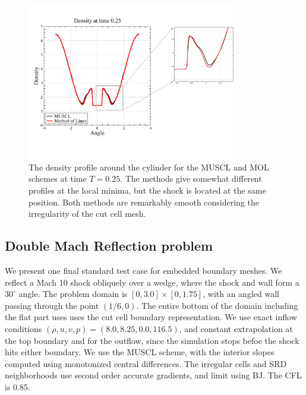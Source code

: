 \begin{figure}[h]
\centering
\hspace*{-.2in}
\includegraphics[height=2.7in]{figs/MM_densityBndry.pdf}
\hspace*{.3in}
\caption{\sf The density profile  around the cylinder for the MUSCL and MOL schemes 
at time $T=0.25$.  The methods give somewhat different profiles at the
local minima, but the shock is  located at the same position.
Both methods  are remarkably smooth considering the
irregularity of the cut cell mesh.}
\label{fig:cylbndry}
\end{figure}

\clearpage

\subsection{Double Mach Reflection problem}\label{sec:dm}
We present one final standard test case for embedded
boundary meshes. We reflect a Mach 10 shock obliquely over a wedge, 
where the shock and wall form a $30^{\circ}$ angle.  
The problem domain is $[0,3.0]\times[0,1.75]$, with an angled wall 
passing through the point $(1/6,0)$. 
The entire bottom of the domain including the flat part uses
uses the cut cell boundary representation.
We use exact inflow conditions $(\rho,u,v,p) = (8.0,8.25,0.0,116.5)$, and 
constant extrapolation at the top boundary and for the outflow, since
the simulation stops befoe the shock hits either boundary.
We use the MUSCL scheme, with the interior slopes 
computed using monotonized central differences. The irregular cells and
SRD neighborhoods use second order accurate 
gradients, and limit using BJ.
The CFL is 0.85.


